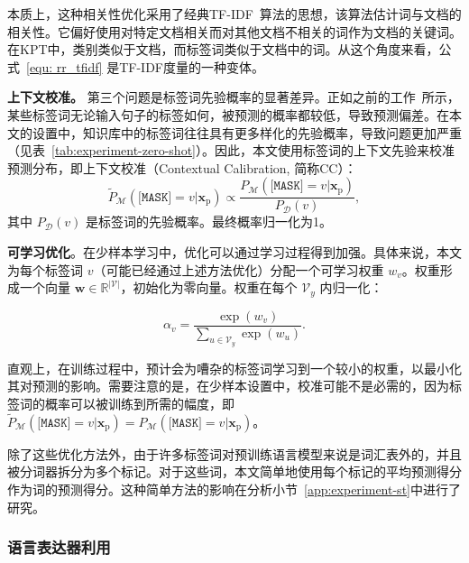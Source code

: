 本质上，这种相关性优化采用了经典TF-IDF~\cite{jones1972statistical}算法的思想，该算法估计词与文档的相关性。它偏好使用对特定文档相关而对其他文档不相关的词作为文档的关键词。在KPT中，类别类似于文档，而标签词类似于文档中的词。从这个角度来看，公式~\eqref{equ: rr_tfidf} 是TF-IDF度量的一种变体。 


\textbf{上下文校准。}\quad
\label{sec: refine-CC}
第三个问题是标签词先验概率的显著差异。正如之前的工作~\cite{pmlr-v139-zhao21c, holtzman2021surface}所示，某些标签词无论输入句子的标签如何，被预测的概率都较低，导致预测偏差。在本文的设置中，知识库中的标签词往往具有更多样化的先验概率，导致问题更加严重（见表~\ref{tab:experiment-zero-shot}）。因此，本文使用标签词的上下文先验来校准预测分布，即上下文校准（Contextual Calibration, 简称CC）：
\begin{equation}
    \tilde{P}_{\mathcal{M}}(\!\texttt{[MASK]}\!\!\!=\!v|\mathbf{x}_{\text{p}}) \!\propto\! \frac{P_{\mathcal{M}}(\!\texttt{[MASK]}\!\!\!=\!v|\mathbf{x}_{\text{p}})}{P_{\mathcal{D}}(v)},
\end{equation}
其中 $P_{\mathcal{D}}(v)$ 是标签词的先验概率。最终概率归一化为1。

\textbf{可学习优化}。在少样本学习中，优化可以通过学习过程得到加强。具体来说，本文为每个标签词 $v$（可能已经通过上述方法优化）分配一个可学习权重 $w_v$。权重形成一个向量 $\mathbf{w}\in \mathbb{R}^{|\mathcal{V}|}$，初始化为零向量。权重在每个 $\mathcal{V}_y$ 内归一化：

\begin{equation}
    \alpha_v = \frac{\operatorname{exp}(w_v)}{\sum_{u\in \mathcal{V}_y} \operatorname{exp}(w_u)}.
\end{equation}

直观上，在训练过程中，预计会为嘈杂的标签词学习到一个较小的权重，以最小化其对预测的影响。需要注意的是，在少样本设置中，校准可能不是必需的，因为标签词的概率可以被训练到所需的幅度，即 $\tilde{P}_{\mathcal{M}}(\texttt{[MASK]}\!\!\!=\!v|\mathbf{x}_{\text{p}}) ={P_{\mathcal{M}}(\texttt{[MASK]}\!\!\!=\!v|\mathbf{x}_{\text{p}})}$。

除了这些优化方法外，由于许多标签词对预训练语言模型来说是词汇表外的，并且被分词器拆分为多个标记。对于这些词，本文简单地使用每个标记的平均预测得分作为词的预测得分。这种简单方法的影响在分析小节~\ref{app:experiment-st}中进行了研究。

\subsubsection{语言表达器利用}
\label{sec:use}

